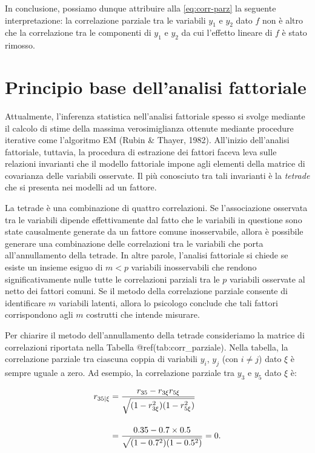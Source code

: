 \documentclass[
  11pt,
]{krantz}
\theoremstyle{definition}
\theoremstyle{definition}
\theoremstyle{definition}
\theoremstyle{definition}
\theoremstyle{remark}
\begin{document}
In conclusione, possiamo dunque attribuire alla \eqref{eq:corr-parz} la seguente interpretazione: la correlazione parziale tra le variabili \(y_1\) e \(y_2\) dato \(f\) non è altro che la correlazione tra le componenti di \(y_1\) e \(y_2\) da cui l'effetto lineare di \(f\) è stato rimosso.

\hypertarget{principio-base-dellanalisi-fattoriale}{%
\section{Principio base dell'analisi fattoriale}\label{principio-base-dellanalisi-fattoriale}}

Attualmente, l'inferenza statistica nell'analisi fattoriale spesso si svolge mediante il calcolo di stime della massima verosimiglianza ottenute mediante procedure iterative come l'algoritmo EM (Rubin \& Thayer, 1982). All'inizio dell'analisi fattoriale, tuttavia, la procedura di estrazione dei fattori faceva leva sulle relazioni invarianti che il modello fattoriale impone agli elementi della matrice di covarianza delle variabili osservate. Il più conosciuto tra tali invarianti è la \emph{tetrade} che si presenta nei modelli ad un fattore.

La tetrade è una combinazione di quattro correlazioni. Se l'associazione osservata tra le variabili dipende effettivamente dal fatto che le variabili in questione sono state causalmente generate da un fattore comune inosservabile, allora è possibile generare una combinazione delle correlazioni tra le variabili che porta all'annullamento della tetrade. In altre parole, l'analisi fattoriale si chiede se esiste un insieme esiguo di \(m<p\) variabili inosservabili che rendono significativamente nulle tutte le correlazioni parziali tra le \(p\) variabili osservate al netto dei fattori comuni. Se il metodo della correlazione parziale consente di identificare \(m\) variabili latenti, allora lo psicologo conclude che tali fattori corrispondono agli \(m\) costrutti che intende misurare.

Per chiarire il metodo dell'annullamento della tetrade consideriamo la matrice di correlazioni riportata nella Tabella @ref(tab:corr\_parziale). Nella tabella, la correlazione parziale tra ciascuna coppia di variabili \(y_i\), \(y_j\) (con \(i \neq j\)) dato \(\xi\) è sempre uguale a zero. Ad esempio, la correlazione parziale tra \(y_3\) e \(y_5\) dato \(\xi\) è:

\begin{equation}
\begin{aligned}
  r_{35 \mid \xi} &= \frac{r_{35} - r_{3\xi}r_{5\xi}}
  {\sqrt{(1-r_{3\xi}^2)(1-r_{5\xi}^2)}} \notag \\[12pt]
  &= \frac{0.35 - 0.7 \times 0.5}
  {\sqrt{(1-0.7^2)(1-0.5^2)}} = 0. \notag
  \end{aligned}
\end{equation}
\end{document}
